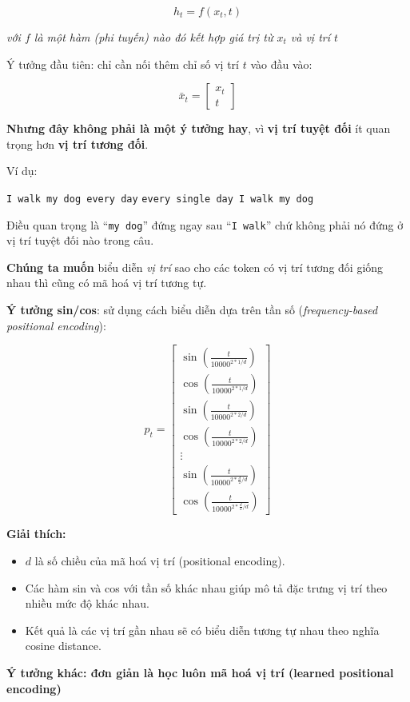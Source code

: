 \documentclass{book}
\begin{document}
    \[
    h_t = f(x_t, t)
    \]
    
    \begin{flushleft}
        \textit{với $f$ là một hàm (phi tuyến) nào đó kết hợp giá trị từ $x_t$ và vị trí $t$}
    \end{flushleft}
    Ý tưởng đầu tiên: chỉ cần nối thêm chỉ số vị trí $t$ vào đầu vào:

    \[
    \bar{x}_t = \begin{bmatrix}
    x_t \\
    t
    \end{bmatrix}
    \]
    
    \textbf{Nhưng đây không phải là một ý tưởng hay}, vì \textbf{vị trí tuyệt đối} ít quan trọng hơn \textbf{vị trí tương đối}.
    
    Ví dụ:
    
    \begin{center}
    \texttt{I walk my dog every day} \quad \texttt{every single day I walk my dog}
    \end{center}
    
    Điều quan trọng là ``\texttt{my dog}'' đứng ngay sau ``\texttt{I walk}'' chứ không phải nó đứng ở vị trí tuyệt đối nào trong câu.
    
    \vspace{1em}
    \noindent
    \textbf{Chúng ta muốn} biểu diễn \textit{vị trí} sao cho các token có vị trí tương đối giống nhau thì cũng có mã hoá vị trí tương tự.
    
    \vspace{1em}
    \noindent
    \textbf{Ý tưởng sin/cos}: sử dụng cách biểu diễn dựa trên tần số (\textit{frequency-based positional encoding}):
    
    \[
    p_t = \begin{bmatrix}
    \sin\left(\frac{t}{10000^{2 * 1 / d}}\right) \\
    \cos\left(\frac{t}{10000^{2 * 1 / d}}\right) \\
    \sin\left(\frac{t}{10000^{2 * 2 / d}}\right) \\
    \cos\left(\frac{t}{10000^{2 * 2 / d}}\right) \\
    \vdots \\
    \sin\left(\frac{t}{10000^{2 * \frac{d}{2}/d}}\right) \\
    \cos\left(\frac{t}{10000^{2 * \frac{d}{2}/d}}\right)
    \end{bmatrix}
    \]
    
    \textbf{Giải thích:}
    \begin{itemize}
        \item $d$ là số chiều của mã hoá vị trí (positional encoding).
        \item Các hàm sin và cos với tần số khác nhau giúp mô tả đặc trưng vị trí theo nhiều mức độ khác nhau.
        \item Kết quả là các vị trí gần nhau sẽ có biểu diễn tương tự nhau theo nghĩa cosine distance.
    \end{itemize}
    \textbf{Ý tưởng khác: đơn giản là học luôn mã hoá vị trí (learned positional encoding)}
    
\end{document}
